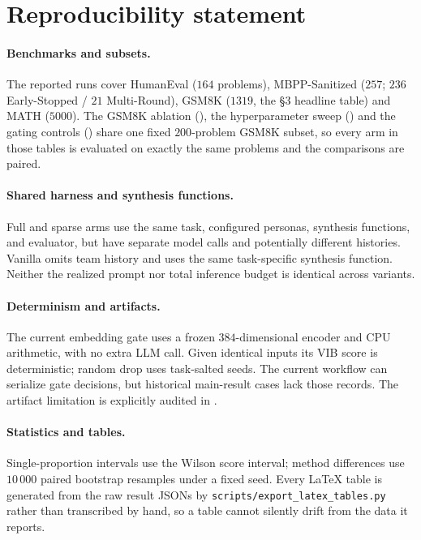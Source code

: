 \documentclass[11pt,twoside,twocolumn,letterpaper]{article}
\begin{document}
\section{Reproducibility statement}\label{app:repro}

\paragraph{Benchmarks and subsets.} The reported runs cover HumanEval ($164$ problems), MBPP-Sanitized ($257$; $236$ Early-Stopped / $21$ Multi-Round), GSM8K ($1319$, the \S3 headline table) and MATH ($5000$). The GSM8K ablation (), the hyperparameter sweep () and the gating controls () share one fixed $200$-problem GSM8K subset, so every arm in those tables is evaluated on exactly the same problems and the comparisons are paired.

\paragraph{Shared harness and synthesis functions.} Full and sparse arms use the same task, configured personas, synthesis functions, and evaluator, but have separate model calls and potentially different histories. Vanilla omits team history and uses the same task-specific synthesis function. Neither the realized prompt nor total inference budget is identical across variants.

\paragraph{Determinism and artifacts.} The current embedding gate uses a frozen $384$-dimensional encoder and CPU arithmetic, with no extra LLM call. Given identical inputs its VIB score is deterministic; random drop uses task-salted seeds. The current workflow can serialize gate decisions, but historical main-result cases lack those records. The artifact limitation is explicitly audited in .

\paragraph{Statistics and tables.} Single-proportion intervals use the Wilson score interval; method differences use $10\,000$ paired bootstrap resamples under a fixed seed. Every LaTeX table is generated from the raw result JSONs by \texttt{scripts/export\_latex\_tables.py} rather than transcribed by hand, so a table cannot silently drift from the data it reports.
\end{document}
